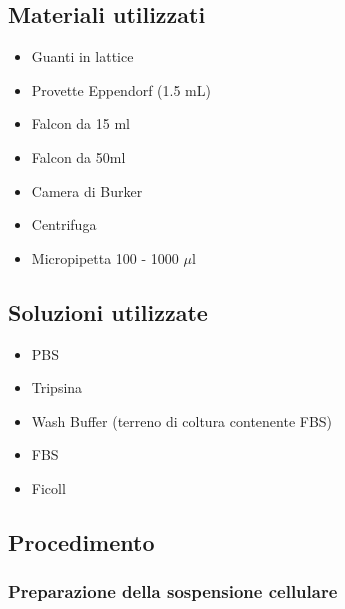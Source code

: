 \subsection{Materiali utilizzati}

\begin{itemize}
\item Guanti in lattice
\item Provette Eppendorf (1.5 mL)
\item Falcon da 15 ml
\item Falcon da 50ml
\item Camera di Burker
\item Centrifuga
\item Micropipetta 100 - 1000 $\mu$l

\end{itemize}

\subsection{Soluzioni utilizzate}

\begin{itemize}

\item PBS
\item Tripsina
\item Wash Buffer (terreno di coltura contenente FBS)
\item FBS
\item Ficoll

\end{itemize}

\subsection{Procedimento}

\subsubsection{Preparazione della sospensione cellulare}

